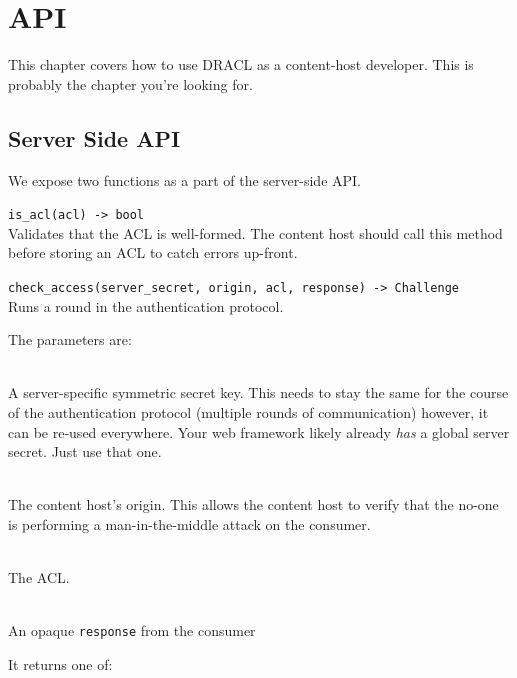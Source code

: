 \documentclass[pdftex,12pt,a4papaer,twoside,notitlepage]{report}
\begin{document}
\chapter{API}
\label{chap:api}

This chapter covers how to use DRACL as a content-host developer. This is
probably the chapter you're looking for.

\section{Server Side API}

We expose two functions as a part of the server-side API.

\begin{compactitem}[$\lambda$]
\item \verb=is_acl(acl) -> bool= \\
  Validates that the ACL is well-formed. The content host should call this
  method before storing an ACL to catch errors up-front.
\item \verb=check_access(server_secret, origin, acl, response) -> Challenge= \\
  Runs a round in the authentication protocol.

  The parameters are:

  \begin{description}[labelindent=2em,leftmargin=4em]
  \item[\texttt{server\_secret}] \hfill \\
    A server-specific symmetric secret key. This needs to stay the same for the
    course of the authentication protocol (multiple rounds of communication)
    however, it can be re-used everywhere. Your web framework likely already
    \emph{has} a global server secret. Just use that one.
  \item[\texttt{origin}] \hfill \\
    The content host's origin. This allows the content host to verify that the
    no-one is performing a man-in-the-middle attack on the consumer.
  \item[\texttt{acl}] \hfill \\
    The ACL.
  \item[\texttt{response}] \hfill \\
    An opaque \texttt{response} from the consumer
  \end{description}

  It returns one of:


\end{compactitem}
\end{document}

